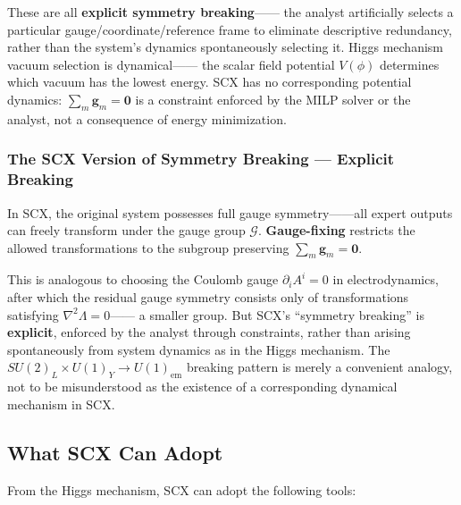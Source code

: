 \documentclass[12pt,a4paper]{article}
\theoremstyle{remark}
\newcommand{\gaugeparam}{\mathbf{g}}
\newcommand{\calG}{\mathcal{G}}
\begin{document}
These are all \textbf{explicit symmetry breaking}——
the analyst artificially selects a particular gauge/coordinate/reference frame to eliminate descriptive redundancy,
rather than the system's dynamics spontaneously selecting it. Higgs mechanism vacuum selection is dynamical——
the scalar field potential $V(\phi)$ determines which vacuum has the lowest energy.
SCX has no corresponding potential dynamics: $\sum_m \gaugeparam_m = \mathbf{0}$ is
a constraint enforced by the MILP solver or the analyst, not a consequence of energy minimization.

\subsubsection{The SCX Version of Symmetry Breaking — Explicit Breaking}

In SCX, the original system possesses full gauge symmetry——all expert outputs can freely transform under the gauge group $\calG$.
\textbf{Gauge-fixing} restricts the allowed transformations to the subgroup preserving $\sum_m \gaugeparam_m = \mathbf{0}$.

This is analogous to choosing the Coulomb gauge $\partial_i A^i = 0$ in electrodynamics, after which
the residual gauge symmetry consists only of transformations satisfying $\nabla^2\Lambda = 0$——
a smaller group. But SCX's ``symmetry breaking'' is \textbf{explicit},
enforced by the analyst through constraints, rather than arising spontaneously from system dynamics as in the Higgs mechanism.
The $SU(2)_L \times U(1)_Y \to U(1)_{\text{em}}$ breaking pattern is merely a convenient analogy,
not to be misunderstood as the existence of a corresponding dynamical mechanism in SCX.

\subsection{What SCX Can Adopt}

From the Higgs mechanism, SCX can adopt the following tools:
\end{document}
